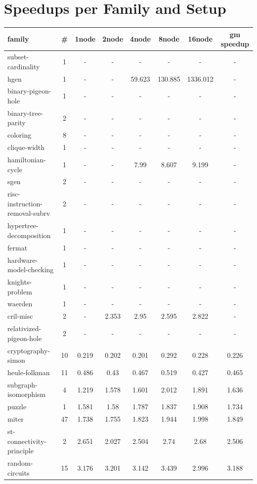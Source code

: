 \documentclass[12pt,a4paper,twoside]{scrartcl}
\numberwithin{equation}{section}
\begin{document}
\section{Speedups per Family and Setup}
\label{app:speedupsFamiliesComplete}
\begin{longtable}{ lccccccc }
  \toprule
  family	&	\#	&	1node	&	2node	&	4node	&	8node	&	16node	&	gm speedup\\
  \midrule
  subset-cardinality	&	1	&	-	&	-	&	-	&	-	&	-	&	-\\
  hgen	&	1	&	-	&	-	&	59.623	&	130.885	&	1336.012	&	-\\
  binary-pigeon-hole	&	1	&	-	&	-	&	-	&	-	&	-	&	-\\
  binary-tree-parity	&	2	&	-	&	-	&	-	&	-	&	-	&	-\\
  coloring	&	8	&	-	&	-	&	-	&	-	&	-	&	-\\
  clique-width	&	1	&	-	&	-	&	-	&	-	&	-	&	-\\
  hamiltonian-cycle	&	1	&	-	&	-	&	7.99	&	8.607	&	9.199	&	-\\
  sgen	&	2	&	-	&	-	&	-	&	-	&	-	&	-\\
  risc-instruction-removal-subrv	&	2	&	-	&	-	&	-	&	-	&	-	&	-\\
  hypertree-decomposition	&	1	&	-	&	-	&	-	&	-	&	-	&	-\\
  fermat	&	1	&	-	&	-	&	-	&	-	&	-	&	-\\
  hardware-model-checking	&	1	&	-	&	-	&	-	&	-	&	-	&	-\\
  knights-problem	&	1	&	-	&	-	&	-	&	-	&	-	&	-\\
  waerden	&	1	&	-	&	-	&	-	&	-	&	-	&	-\\
  cril-misc	&	2	&	-	&	2.353	&	2.95	&	2.595	&	2.822	&	-\\
  relativized-pigeon-hole	&	2	&	-	&	-	&	-	&	-	&	-	&	-\\
  cryptography-simon	&	10	&	0.219	&	0.202	&	0.201	&	0.292	&	0.228	&	0.226\\
  heule-folkman	&	11	&	0.486	&	0.43	&	0.467	&	0.519	&	0.427	&	0.465\\
  subgraph-isomorphism	&	4	&	1.219	&	1.578	&	1.601	&	2.012	&	1.891	&	1.636\\
  puzzle	&	1	&	1.581	&	1.58	&	1.787	&	1.837	&	1.908	&	1.734\\
  miter	&	47	&	1.738	&	1.755	&	1.823	&	1.944	&	1.998	&	1.849\\
  st-connectivity-principle	&	2	&	2.651	&	2.027	&	2.504	&	2.74	&	2.68	&	2.506\\
  random-circuits	&	15	&	3.176	&	3.201	&	3.142	&	3.439	&	2.996	&	3.188\\

\end{longtable}
\end{document}
